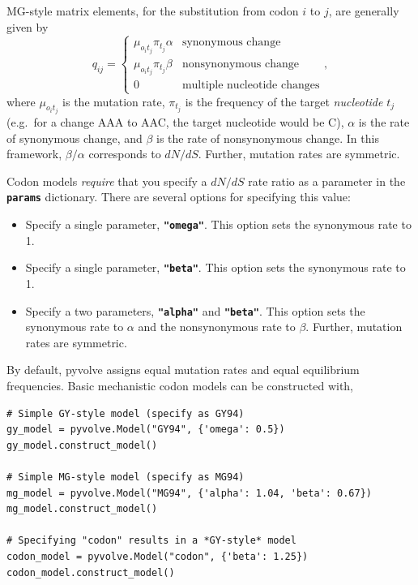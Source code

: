 \documentclass{article}
\newcommand{\code}[1]{\textbf{\texttt{\small{#1}}}}
\begin{document}
MG-style \citep{MG94} matrix elements, for the substitution from codon $i$ to $j$, are generally given by 
\begin{equation}\label{eq:MGstyle}
q_{ij} = \left\{ 
\begin{array}{rl}
\mu_{o_it_j}\pi_{t_j} \alpha         &\text{synonymous change} \\
\mu_{o_it_j}\pi_{t_j} \beta  &\text{nonsynonymous change} \\
0                             &\text{multiple nucleotide changes}       
\end{array} \right. ,
\end{equation}
where $\mu_{o_it_j}$ is the mutation rate, $\pi_{t_j}$ is the frequency of the target \emph{nucleotide} $t_j$ (e.g.\ for a change AAA to AAC, the target nucleotide would be C), $\alpha$ is the rate of synonymous change, and $\beta$ is the rate of nonsynonymous change. In this framework, $\beta / \alpha$ corresponds to $dN/dS$. Further, mutation rates are symmetric.

Codon models \emph{require} that you specify a $dN/dS$ rate ratio as a parameter in the \code{params} dictionary. There are several options for specifying this value:
\begin{itemize}
	\item Specify a single parameter, \code{"omega"}. This option sets the synonymous rate to 1.
	\item Specify a single parameter, \code{"beta"}. This option sets the synonymous rate to 1.
	\item Specify a two parameters, \code{"alpha"} and \code{"beta"}. This option sets the synonymous rate to $\alpha$ and the nonsynonymous rate to $\beta$. Further, mutation rates are symmetric.
\end{itemize}

By default, pyvolve assigns equal mutation rates and equal equilibrium frequencies. Basic mechanistic codon models can be constructed with,
\begin{lstlisting}
# Simple GY-style model (specify as GY94)
gy_model = pyvolve.Model("GY94", {'omega': 0.5})
gy_model.construct_model()

# Simple MG-style model (specify as MG94)
mg_model = pyvolve.Model("MG94", {'alpha': 1.04, 'beta': 0.67})
mg_model.construct_model()

# Specifying "codon" results in a *GY-style* model
codon_model = pyvolve.Model("codon", {'beta': 1.25})
codon_model.construct_model()
\end{lstlisting}
\end{document}
